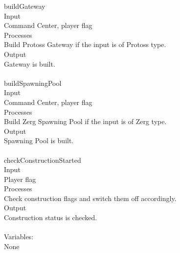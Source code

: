 \documentclass[10pt,letterpaper,onecolumn,draftclsnofoot]{IEEEtran}
\begin{document}
buildGateway\\
Input\\
Command Center, player flag\\
Processes\\
Build Protoss Gateway if the input is of Protoss type.\\
Output\\
Gateway is built.\\
\\
buildSpawningPool\\
Input\\
Command Center, player flag\\
Processes\\
Build Zerg Spawning Pool if the input is of Zerg type.\\
Output\\
Spawning Pool is built.\\
\\
checkConstructionStarted\\
Input\\
Player flag\\
Processes\\
Check construction flags and switch them off accordingly.\\
Output\\
Construction status is checked.\\
\\
Variables:\\
None\\
\\
\end{document}
